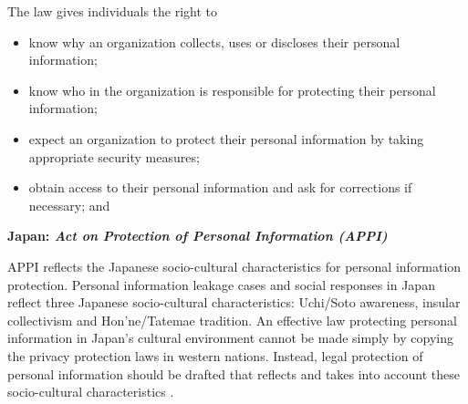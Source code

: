\documentclass{mcmthesis}
\begin{document}
The law gives individuals the right to
\begin{itemize}
\item know why an organization collects, uses or discloses their personal information;
\item know who in the organization is responsible for protecting their personal information;
\item expect an organization to protect their personal information by taking appropriate security measures;
\item obtain access to their personal information and ask for corrections if necessary; and
\end{itemize}



\textbf{Japan: \emph{Act on Protection of Personal Information (APPI)}} 

APPI reflects the Japanese socio-cultural characteristics  for personal information protection. Personal information leakage cases and social responses in Japan reflect three Japanese
socio-cultural characteristics: Uchi/Soto awareness, insular collectivism and Hon'ne/Tatemae
tradition. An effective law protecting personal information in Japan's cultural environment cannot
be made simply by copying the privacy protection laws in western nations. Instead, legal protection of
personal information should be drafted that reflects and takes into account these socio-cultural
characteristics \cite{orito2008socio}.
\end{document}
